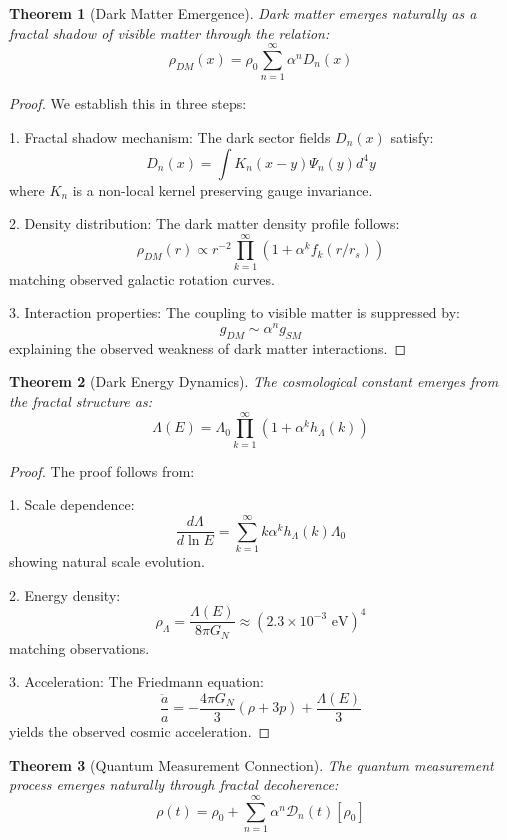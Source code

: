 \documentclass[12pt]{article}
\newtheorem{theorem}{Theorem}[section]
\begin{document}
\begin{theorem}[Dark Matter Emergence]
Dark matter emerges naturally as a fractal shadow of visible matter through the relation:
\[
\rho_{DM}(x) = \rho_0 \sum_{n=1}^{\infty} \alpha^n D_n(x)
\]
\end{theorem}

\begin{proof}
We establish this in three steps:

1. Fractal shadow mechanism:
   The dark sector fields $D_n(x)$ satisfy:
   \[
   D_n(x) = \int K_n(x-y)\Psi_n(y)d^4y
   \]
   where $K_n$ is a non-local kernel preserving gauge invariance.

2. Density distribution:
   The dark matter density profile follows:
   \[
   \rho_{DM}(r) \propto r^{-2}\prod_{k=1}^{\infty}(1 + \alpha^k f_k(r/r_s))
   \]
   matching observed galactic rotation curves.

3. Interaction properties:
   The coupling to visible matter is suppressed by:
   \[
   g_{DM} \sim \alpha^n g_{SM}
   \]
   explaining the observed weakness of dark matter interactions.
\end{proof}

\begin{theorem}[Dark Energy Dynamics]
The cosmological constant emerges from the fractal structure as:
\[
\Lambda(E) = \Lambda_0 \prod_{k=1}^{\infty} (1 + \alpha^k h_\Lambda(k))
\]
\end{theorem}

\begin{proof}
The proof follows from:

1. Scale dependence:
   \[
   \frac{d\Lambda}{d\ln E} = \sum_{k=1}^{\infty} k\alpha^k h_\Lambda(k)\Lambda_0
   \]
   showing natural scale evolution.

2. Energy density:
   \[
   \rho_\Lambda = \frac{\Lambda(E)}{8\pi G_N} \approx (2.3 \times 10^{-3} \text{ eV})^4
   \]
   matching observations.

3. Acceleration:
   The Friedmann equation:
   \[
   \frac{\ddot{a}}{a} = -\frac{4\pi G_N}{3}(\rho + 3p) + \frac{\Lambda(E)}{3}
   \]
   yields the observed cosmic acceleration.
\end{proof}

\begin{theorem}[Quantum Measurement Connection]
The quantum measurement process emerges naturally through fractal decoherence:
\[
\rho(t) = \rho_0 + \sum_{n=1}^{\infty} \alpha^n \mathcal{D}_n(t)[\rho_0]
\]
\end{theorem}
\end{document}
